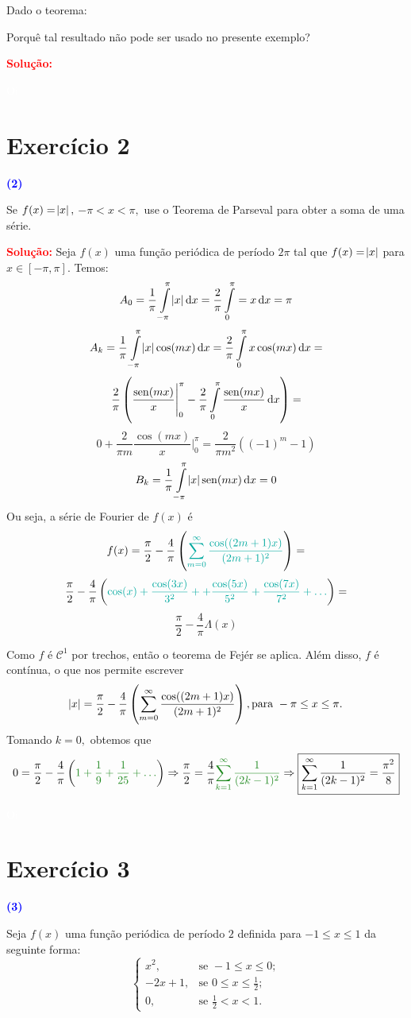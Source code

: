 \documentclass[11pt,a4paper]{article}
\newcommand{\exercicio}[1]{\section*{Exercício #1} \textcolor{blue}{\bf(#1)}}
\newcommand{\solucao}[1]{\begin{mdframed}[style=MyFrame]
\textbf{\textcolor{red}{Solução:}} #1
\end{mdframed}\textcolor{white}{Oi} \newline}
\begin{document}
Dado o teorema:


Porquê tal resultado não pode ser usado no presente exemplo?

\solucao{}


\exercicio{2}

Se $f(x) =\abs{x},$ $- \pi < x < \pi,$ use o Teorema de Parseval para obter a soma de uma série.
\solucao{
Seja $f(x)$ uma função periódica de período $2 \pi$ tal que $f(x) = \abs{x}$ para $x \in [-\pi, \pi].$ Temos:
\[
A_0 = \frac{1}{\pi} \int\limits_{- \pi}^\pi \abs{x} \dif x = \frac{2}{\pi} \int\limits_{0}^\pi = x \dif x = \pi
\]
\[
A_k = \frac{1}{\pi} \int\limits_{-\pi}^{\pi} \abs{x} \cos(mx) \dif x = \frac{2}{\pi} \int\limits_0^\pi x \cos (mx) \dif x = \]\[\frac{2}{\pi} \left( \frac{\sen(mx)}{x} \Bigg|_0^\pi - \frac{2}{\pi} \int\limits_0^\pi \frac{\sen(mx)}{x} \dif x \right) = \]\[0 + \frac{2}{\pi m} \frac{\cos(mx)}{x} \Bigg|_0^\pi = \frac{2}{\pi m^2} ((-1)^m  - 1)
\]
\[
B_k = \frac{1}{\pi} \int\limits_{-\pi}^{\pi} \abs{x} \sen(mx) \dif x = 0
\]
Ou seja, a série de Fourier de $f(x)$ é
\[
f(x) = \frac{\pi}{2} - \frac{4}{\pi} \left( \textcolor{Emerald}{\sum\limits_{m = 0}^\infty \frac{\cos((2m+1)x)}{(2m+1)^2}}\right) = \]\[\frac{\pi}{2} - \frac{4}{\pi} \left(  \textcolor{Emerald}{ \cos(x) + \frac{\cos(3x)}{3^2} + + \frac{\cos(5x)}{5^2} + \frac{\cos(7x)}{7^2} + \ldots } \right) = \]\[ \frac{\pi}{2} - \frac{4}{\pi}\Lambda (x)
\]

Como $f$ é $\mathcal{C}^1$ por trechos, então o teorema de Fejér se aplica. Além disso, $f$ é contínua, o que nos permite escrever
\[
\abs{x} = \frac{\pi}{2} - \frac{4}{\pi} \left( \sum\limits_{m = 0}^\infty \frac{\cos((2m+1)x)}{(2m+1)^2}\right), \mbox{para } -\pi \le x \le \pi.
\]
Tomando $k = 0,$ obtemos que
\[0 = \frac{\pi}{2} - \frac{4}{\pi} \left( \textcolor{Floresta}{1 + \frac{1}{9} + \frac{1}{25} + \ldots }\right) \Rightarrow \frac{\pi}{2} = \frac{4}{\pi} \textcolor{Floresta}{\sum\limits_{k = 1}^\infty \frac{1}{(2k-1)^2}} \Rightarrow \boxed{\sum\limits_{k = 1}^\infty \frac{1}{(2k-1)^2} = \frac{\pi^2}{8}}
\]



}

\exercicio{3}

Seja $f(x)$ uma função periódica de período $2$ definida para $-1 \le x \le 1$ da seguinte forma:
\[\begin{cases}
    x^2, &\mbox{se } -1 \le x \le 0; \\
    -2x+1, &\mbox{se }  0 \le x \le \frac{1}{2};\\
    0, & \mbox{se } \frac{1}{2} < x < 1.
\end{cases}\]
\end{document}
